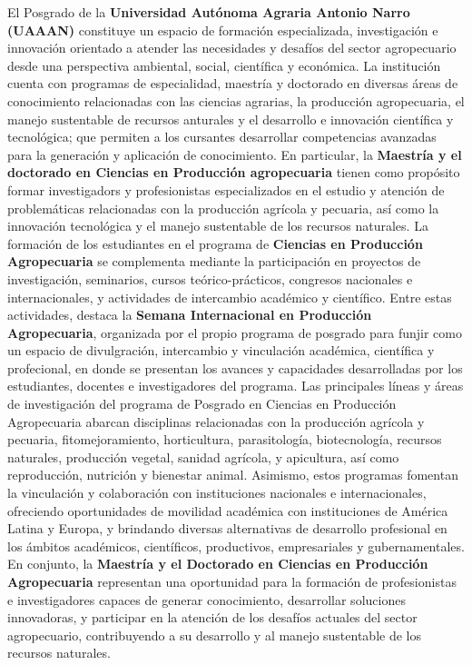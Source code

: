 \begin{browserSubsections}
\vspace*{.5cm}
\begin{resumen}
	\justifying
	El Posgrado de la \textbf{Universidad Autónoma Agraria Antonio Narro (UAAAN)} constituye un espacio de formación especializada, investigación e innovación orientado a atender las necesidades y desafíos del sector agropecuario desde una perspectiva ambiental, social, científica y económica. La institución cuenta con programas de especialidad, maestría y doctorado en diversas áreas de conocimiento relacionadas con las ciencias agrarias, la producción agropecuaria, el manejo sustentable de recursos anturales y el desarrollo e innovación científica y tecnológica; que permiten a los cursantes desarrollar competencias avanzadas para la generación y aplicación de conocimiento. En particular, la \textbf{Maestría y el doctorado en Ciencias en Producción agropecuaria} tienen como propósito formar investigadors y profesionistas especializados en el estudio y atención de problemáticas relacionadas con la producción agrícola y pecuaria, así como la innovación tecnológica y el manejo sustentable de los recursos naturales. La formación de los estudiantes en el programa de \textbf{Ciencias en Producción Agropecuaria} se complementa mediante la participación en proyectos de investigación, seminarios, cursos teórico-prácticos, congresos nacionales e internacionales, y actividades de intercambio académico y científico. Entre estas actividades, destaca la \textbf{Semana Internacional en Producción Agropecuaria}, organizada por el propio programa de posgrado para funjir como un espacio de divulgración, intercambio y vinculación académica, científica y profecional, en donde se presentan los avances y capacidades desarrolladas por los estudiantes, docentes e investigadores del programa. Las principales líneas y áreas de investigación del programa de Posgrado en Ciencias en Producción Agropecuaria abarcan disciplinas relacionadas con la producción agrícola y pecuaria, fitomejoramiento, horticultura, parasitología, biotecnología, recursos naturales, producción vegetal, sanidad agrícola, y apicultura, así como reproducción, nutrición y bienestar animal. Asimismo, estos programas fomentan la vinculación y colaboración con instituciones nacionales e internacionales, ofreciendo oportunidades de movilidad académica con instituciones de América Latina y Europa, y brindando diversas alternativas de desarrollo profesional en los ámbitos académicos, científicos, productivos, empresariales y gubernamentales. En conjunto, la \textbf{Maestría y el Doctorado en Ciencias en Producción Agropecuaria} representan una oportunidad para la formación de profesionistas e investigadores capaces de generar conocimiento, desarrollar soluciones innovadoras, y participar en la atención de los desafíos actuales del sector agropecuario, contribuyendo a su desarrollo y al manejo sustentable de los recursos naturales.
\end{resumen}


\end{browserSubsections}

